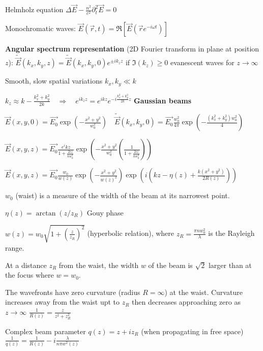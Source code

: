 \begin{squishlist}
    \item Helmholz equation $\Delta \vec{E} - \frac{n^2}{c^2} \partial_t^2 \vec{E} = 0$
    \item Monochromatic waves: $\vec{E}({\vec{r}, t}) = \Re[\vec{E}(\vec{r}e^{-i \omega t})]$
    \item \textbf{Angular spectrum representation} (2D Fourier transform in plane at position $z$): $\tilde{\vec{E}}(k_x, k_y, z) = \tilde{\vec{E}}(k_x, k_y, 0) e^{\pm i k_z z}$ \squishsep if $\Im(k_z) \geq 0$ evanescent waves for $z \rightarrow \infty$
\end{squishlist}
\begin{squishlist}
    \item Smooth, slow spatial variations $k_x, k_y \ll k$
    \item $k_z \approx k - \tfrac{k_x^2 + k_y^2}{2k} \quad \Rightarrow \quad e^{ik_z z} = e^{ikz}e^{-i \tfrac{k_x^2 + k_y^2}{2k}z}$ \textbf{Gaussian beams}
    \item $\vec{E}(x,y,0) = \vec{E_0} \exp\left({-\tfrac{x^2 + y^2}{w_0^2}}\right) \quad \tilde{\vec{E}}(k_x,k_y,0) = \vec{E_0} \frac{w_0^2}{4\pi} \exp \left(- \frac{(k_x^2 + k_y^2)w_0^2}{4}\right)$
    \item $\vec{E}(x,y,z) = \vec{E_0} \frac{e^ikz}{1 + \tfrac{2iz}{kw_0^2}} \exp\left({-\tfrac{x^2 + y^2}{w_0^2}\left(\tfrac{1}{1 + \tfrac{2iz}{kw_0^2}}\right)}\right)$
    \item $\vec{E}(x,y,z) = \vec{E_0} \frac{w_0}{w(z)}\exp\left(-\frac{x^2 + y^2}{w(z)^2}\right) \exp \left(i \left(kz - \eta(z) + \frac{k(x^2 + y^2)}{2 R(z)}\right)\right)$
    \item $w_0$ (waist) is a measure of the width of the beam at its narrowest point.
    \item $\eta(z) = \arctan (z/z_R)$ Gouy phase
    \item $w(z) = w_0 \sqrt{1 + \left(\frac{z}{z_R}\right)^2}$ (hyperbolic relation), where $z_R = \frac{\pi n w_0^2}{\lambda}$ is the Rayleigh range.
    \item At a distance $z_R$ from the waist, the width $w$ of the beam is $\sqrt{2}$ larger than at the focus where $w=w_0$.
    \item The wavefronts have zero curvature (radius $R = \infty$) at the waist. Curvature increases away from the waist upt to $z_R$ then decreases approaching zero as $z \rightarrow \infty$
    $\frac{1}{R(z)} = \frac{z}{z^2 + z^2_R}$
    \item Complex beam parameter $q(z) = z + i z_R$ (when propagating in free space) \\ $\frac{1}{q(z)} = \frac{1}{R(z)} - i \frac{\lambda}{n \pi w^2(z)}$
\end{squishlist}

